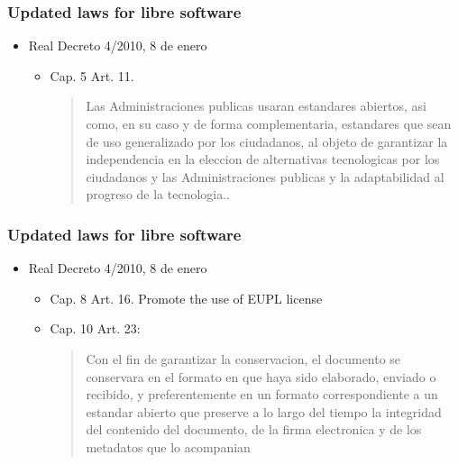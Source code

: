 \documentclass{beamer}
\begin{document}
\begin{frame}
\frametitle{Updated laws for libre software}

\begin{itemize}
\item Real Decreto 4/2010, 8 de enero
\begin {itemize}
\item Cap. 5 Art. 11.
\begin{quote}
Las Administraciones publicas usaran estandares abiertos, asi como, en su caso
y de forma complementaria, estandares que sean de uso generalizado por los ciudadanos,
al objeto de garantizar la independencia en la eleccion de alternativas tecnologicas por los
ciudadanos y las Administraciones publicas y la adaptabilidad al progreso de la tecnologia..

\end{quote}


\end{itemize}

\end{itemize}

\end{frame}


\begin{frame}
\frametitle{Updated laws for libre software}

\begin{itemize}
\item Real Decreto 4/2010, 8 de enero
\begin {itemize}

\item Cap. 8 Art. 16. Promote the use of EUPL license 
\item Cap. 10 Art. 23: 
\begin {quote}
Con el fin de garantizar la conservacion, el documento se conservara en el formato
en que haya sido elaborado, enviado o recibido, y preferentemente en un formato
correspondiente a un estandar abierto que preserve a lo largo del tiempo la integridad del
contenido del documento, de la firma electronica y de los metadatos que lo acompanian

\end{quote} 

\end{itemize}

\end{itemize}

\end{frame}
\end{document}

